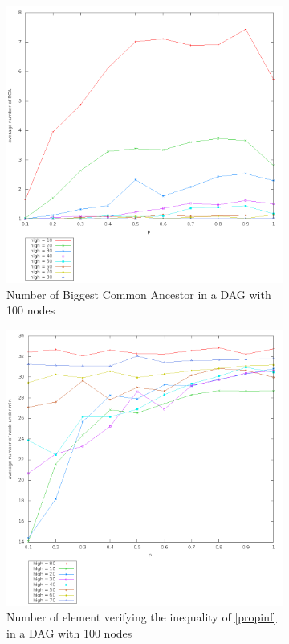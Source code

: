 \begin{figure}[H]
  \centering
 \begin{subfigure}[b]{0.49 \textwidth}
  \includegraphics[width = \textwidth]{./image/resultprelim/averagenbbca.png}
  \caption{Number of Biggest Common Ancestor in a DAG with 100 nodes} \label{fig:nbbca}
 \end{subfigure}
 \begin{subfigure}[b]{0.49 \textwidth}
  \includegraphics[width = \textwidth]{./image/resultprelim/averagenum.png}
  \caption{Number of element verifying the inequality of \ref{propinf} in a DAG with 100 nodes} \label{fig:num}
 \end{subfigure}
 \caption{}
\end{figure}

